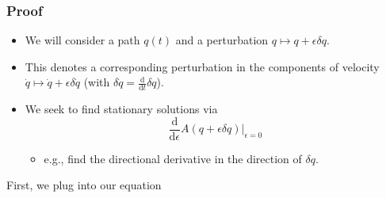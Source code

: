\documentclass[10pt]{article}
\newcommand{\dd}{\text{d}}
\begin{document}
\subsubsection*{Proof}
\begin{itemize}
	\item We will consider a path $q(t)$ and a perturbation $q \mapsto q + \epsilon \delta q$.
	\item This denotes a corresponding perturbation in the components of velocity $\dot{q} \mapsto \dot{q} + \epsilon \delta \dot{q}$ (with $\delta \dot{q} = \frac{\dd}{\dd t} \delta q$).
	\item We seek to find stationary solutions via
	\[\frac{\dd}{\dd \epsilon} A(q + \epsilon \delta q) \bigg|_{\epsilon = 0}\]
    \begin{itemize}
        \item e.g., find the directional derivative in the direction of $\delta q$.
    \end{itemize}
\end{itemize}
First, we plug into our equation
\end{document}
